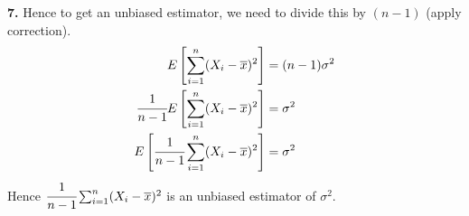 \documentclass{report}
\begin{document}
\textbf{7. } Hence to get an unbiased estimator, we need to divide this by $(n-1)$ (apply correction).
\[\begin{split}
		E\left[ \sum_{i = 1}^n ( X_i - \overline{x} )^2 \right] &= (n - 1) \sigma^2\\
		\cfrac{1}{n-1} E\left[ \sum_{i = 1}^n ( X_i - \overline{x} )^2 \right] &= \sigma^2 \\
		E\left[\cfrac{1}{n-1} \sum_{i = 1}^n ( X_i - \overline{x} )^2 \right] &= \sigma^2 \\
	\end{split}\]
Hence $\cfrac{1}{n-1} \sum_{i = 1}^n ( X_i - \overline{x} )^2 $ is an unbiased estimator of $\sigma^2$.
\end{document}
